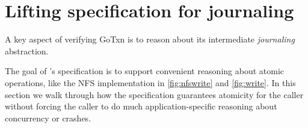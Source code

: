 \section{Lifting specification for journaling}%
\label{sec:txn:lifting}




A key aspect of verifying GoTxn is to reason about its intermediate
\emph{journaling} abstraction.



\resume

The goal of \txn's specification is to support convenient reasoning about atomic
operations, like the NFS  implementation in \cref{fig:nfswrite} and \cref{fig:write}.
In this section we walk through how the specification
guarantees atomicity for the caller without forcing the caller to do
much application-specific reasoning about concurrency or
crashes.

